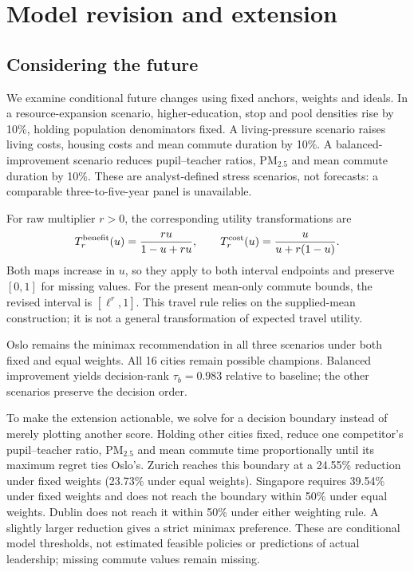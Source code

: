 \documentclass[11pt]{article}
\begin{document}
\section{Model revision and extension}
\subsection{Considering the future}
We examine conditional future changes using fixed anchors, weights and ideals. In a resource-expansion scenario, higher-education, stop and pool densities rise by 10\%, holding population denominators fixed. A living-pressure scenario raises living costs, housing costs and mean commute duration by 10\%. A balanced-improvement scenario reduces pupil--teacher ratios, PM$_{2.5}$ and mean commute duration by 10\%. These are analyst-defined stress scenarios, not forecasts: a comparable three-to-five-year panel is unavailable.

For raw multiplier $r>0$, the corresponding utility transformations are
\begin{equation}
 T_r^{\rm benefit}(u)=\frac{ru}{1-u+ru},\qquad
 T_r^{\rm cost}(u)=\frac{u}{u+r(1-u)}.
\end{equation}
Both maps increase in $u$, so they apply to both interval endpoints and preserve $[0,1]$ for missing values. For the present mean-only commute bounds, the revised interval is $[\ell^r,1]$. This travel rule relies on the supplied-mean construction; it is not a general transformation of expected travel utility.

Oslo remains the minimax recommendation in all three scenarios under both fixed and equal weights. All 16 cities remain possible champions. Balanced improvement yields decision-rank $\tau_b=0.983$ relative to baseline; the other scenarios preserve the decision order.

To make the extension actionable, we solve for a decision boundary instead of merely plotting another score. Holding other cities fixed, reduce one competitor's pupil--teacher ratio, PM$_{2.5}$ and mean commute time proportionally until its maximum regret ties Oslo's. Zurich reaches this boundary at a 24.55\% reduction under fixed weights (23.73\% under equal weights). Singapore requires 39.54\% under fixed weights and does not reach the boundary within 50\% under equal weights. Dublin does not reach it within 50\% under either weighting rule. A slightly larger reduction gives a strict minimax preference. These are conditional model thresholds, not estimated feasible policies or predictions of actual leadership; missing commute values remain missing.
\end{document}
